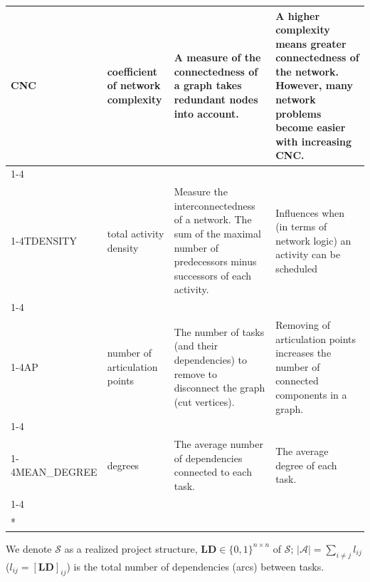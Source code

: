 \documentclass[preprint,
3p]{elsarticle} %
\begin{document}
\begin{appendices}
\begin{longtable}[t]{l>{\raggedright\arraybackslash}p{2.2cm}>{\raggedright\arraybackslash}p{3.6cm}>{\raggedright\arraybackslash}p{3.6cm}}
CNC & coefficient of network complexity & A measure of the connectedness of a graph takes redundant nodes into account. & A higher complexity means greater connectedness of the network. However, many network problems become easier with increasing CNC.\\
\cmidrule{1-4}\pagebreak[0]
\cellcolor{gray!10}{OS} & \cellcolor{gray!10}{order strength} & \cellcolor{gray!10}{The number of precedence relations (including the transitive ones) divided by the theoretical maximum number of precedence relations.} & \cellcolor{gray!10}{Assessing the complexity and flexibility of the project network and the project schedule.}\\
\cmidrule{1-4}\pagebreak[0]
TDENSITY & total activity density & Measure the interconnectedness of a network. The sum of the maximal number of predecessors minus successors of each activity. & Influences when (in terms of network logic) an activity can be scheduled\\
\cmidrule{1-4}\pagebreak[0]
\cellcolor{gray!10}{XDENSITY} & \cellcolor{gray!10}{average activity density} & \cellcolor{gray!10}{Sum of the maximal number of predecessors minus successors of each activity, divided by the number of activities} & \cellcolor{gray!10}{Influences when (in terms of network logic) an activity can be scheduled}\\
\cmidrule{1-4}\pagebreak[0]
AP & number of articulation points & The number of tasks (and their dependencies) to remove to disconnect the graph (cut vertices). & Removing of articulation points increases the number of connected components in a graph.\\
\cmidrule{1-4}\pagebreak[0]
\cellcolor{gray!10}{COMPS} & \cellcolor{gray!10}{components} & \cellcolor{gray!10}{Size of the largest (strongly) connected component.} & \cellcolor{gray!10}{The robustness of the network against disruptions.}\\
\cmidrule{1-4}\pagebreak[0]
MEAN\_DEGREE & degrees & The average number of dependencies connected to each task. & The average degree of each task.\\
\cmidrule{1-4}\pagebreak[0]
\cellcolor{gray!10}{NARC} & \cellcolor{gray!10}{number of arcs} & \cellcolor{gray!10}{Number of arcs (precedence relationships).} & \cellcolor{gray!10}{How many dependencies each task have.}\\*
\end{longtable}
\endgroup{}

We denote \(\mathcal{S}\) as a realized project structure,
\(\mathbf{LD} \in \{0,1\}^{n\times n}\) of \(\mathcal{S}\);
\(|\mathcal{A}| = \sum_{i \neq j} l_{ij}\)
(\(l_{ij}=[\mathbf{LD}]_{ij}\)) is the total number of dependencies
(arcs) between tasks.


\end{appendices}
\end{document}
